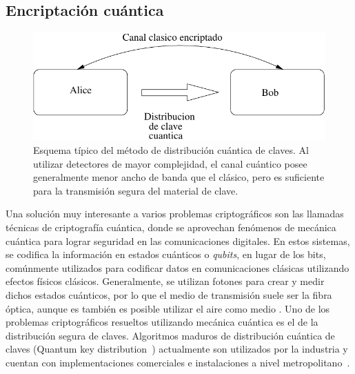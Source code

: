 
\subsection{Encriptación cuántica}

\begin{figure}[t]
  \centering
  \includegraphics[width=0.5 \textwidth]{graphs/quantum} 
  \caption{Esquema típico del método de distribución cuántica de claves. Al utilizar detectores de mayor complejidad, el canal cuántico posee generalmente menor ancho de banda que el clásico, pero es suficiente para la transmisión segura del material de clave.}
  \label{fig_quant}
\end{figure}


\label{quantcry}
Una solución muy interesante a varios problemas criptográficos son las llamadas técnicas de criptografía cuántica, donde se aprovechan fenómenos de mecánica cuántica para lograr seguridad en las comunicaciones digitales.
En estos sistemas, se codifica la información en estados cuánticos o \textit{qubits}, en lugar de los bits, comúnmente utilizados para codificar datos en comunicaciones clásicas utilizando efectos físicos clásicos. Generalmente, se utilizan fotones para crear y medir dichos estados cuánticos, por lo que el medio de transmisión suele ser la fibra óptica, aunque es también es posible utilizar el aire como medio \cite{alleaume2004experimental}.
Uno de los problemas criptográficos resueltos utilizando mecánica cuántica es el de la distribución segura de claves. Algoritmos maduros de distribución cuántica de claves (Quantum key distribution~\cite{bb84}) actualmente son utilizados por la industria y cuentan con implementaciones comerciales e instalaciones a nivel metropolitano~\cite{sasaki2011field}. 

